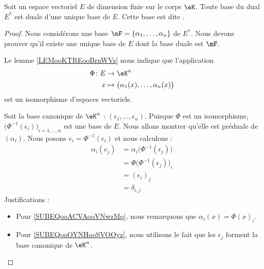 \begin{propositionDef}            \label{PROPooDBPGooPagbEB}
	Soit un espace vectoriel \( E\) de dimension finie sur le corps \( \eK\). Toute base du dual \( E^*\) est duale d'une unique base de \( E\). Cette base est dite .
\end{propositionDef}

\begin{proof}
	Nous considérons une base \( \mF=\{ \alpha_1,\ldots,\alpha_n \}\) de \( E^*\). Nous devons prouver qu'il existe une unique base de \( E\) dont la base duale est \( \mF\).

	\begin{subproof}
		\spitem[Existence]
		Le lemme \ref{LEMooKTREooBrnWVz} nous indique que l'application
		\begin{equation}
			\begin{aligned}
				\Phi\colon  E & \to \eK^n                                           \\
				x             & \mapsto \big( \alpha_1(x),\ldots, \alpha_n(x) \big)
			\end{aligned}
		\end{equation}
		est un isomorphisme d'espaces vectoriels.

		Soit la base canonique de \( \eK^n\) : \( (\epsilon_1,\ldots, \epsilon_n)\). Puisque \( \Phi\) est un isomorphisme, \( \big( \Phi^{-1}(\epsilon_i) \big)_{i=1,\ldots, n}\) est une base de \( E\). Nous allons montrer qu'elle est préduale de \( (\alpha_i)\). Nous posons \( e_i=\Phi^{-1}(\epsilon_i)\) et nous calculons :
		\begin{subequations}
			\begin{align}
				\alpha_i(e_j) & =\alpha_i\big( \Phi^{-1}(\epsilon_j) \big)                                  \\
				              & =\Phi\big( \Phi^{-1}(\epsilon_j) \big)_i        \label{SUBEQooACVAooVNwzMq} \\
				              & =(\epsilon_i)_j                                                             \\
				              & =\delta_{i,j}                                   \label{SUBEQooOYNHooSVOOyz}
			\end{align}
		\end{subequations}
		Justifications :
		\begin{itemize}
			\item Pour \ref{SUBEQooACVAooVNwzMq}, nous remarquons que \( \alpha_i(x)=\Phi(x)_i\).
			\item Pour \ref{SUBEQooOYNHooSVOOyz}, nous utilisons le fait que les \( \epsilon_j\) forment la base canonique de \( \eK^n\).
		\end{itemize}


\end{subproof}
\end{proof}
